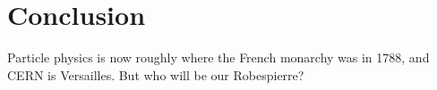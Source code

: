 \section{Conclusion}
Particle physics is now roughly where the French monarchy was in 1788, and CERN is Versailles. But who will be our Robespierre?
